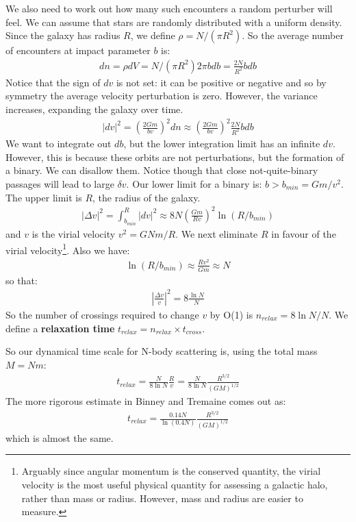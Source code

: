 \documentclass[12pt]{article}
\begin{document}
We also need to work out how many such encounters a random perturber will feel. We can assume that stars are randomly distributed with a uniform density. Since the galaxy has radius $R$, we define $\rho = N / (\pi R^2)$. So the average number of encounters at impact parameter $b$ is:
\begin{align}
 dn = \rho dV = N / (\pi R^2) 2 \pi b db = \frac{2 N}{R^2} b db
\end{align}
Notice that the sign of $dv$ is not set: it can be positive or negative and so by symmetry the average velocity perturbation is zero. However, the variance increases, expanding the galaxy over time.
\begin{align}
 |d v |^2 = \left(\frac{2 G m}{b v}\right)^2 dn \approx \left(\frac{2 G m}{b v}\right)^2 \frac{2 N}{R^2} b db
\end{align}
We want to integrate out $db$, but the lower integration limit has an infinite $dv$. However, this is because these orbits are not perturbations, but the formation of a binary. We can disallow them. Notice though that close not-quite-binary passages will lead to large $\delta v$. Our lower limit for a binary is: $b > b_{min} = G m / v^2$. The upper limit is $R$, the radius of the galaxy.
\begin{align}
 |\Delta v |^2 = \int^R_{b_{min}} |dv|^2 \approx 8 N \left(\frac{G m}{R v}\right)^2 \ln (R/b_{min})
\end{align}
and $v$ is the virial velocity $v^2 = G N m / R$. We next eliminate $R$ in favour of the virial velocity\footnote{Arguably since angular momentum is the conserved quantity, the virial velocity is the most useful physical quantity for assessing a galactic halo, rather than mass or radius. However, mass and radius are easier to measure.}. Also we have:
\begin{align}
\ln (R/b_{min}) \approx \frac{R v^2}{G m} \approx N
\end{align}
so that:
\begin{align}
 \left|\frac{\Delta v}{v} \right|^2 = 8 \frac{\ln N }{N}
\end{align}
So the number of crossings required to change $v$ by O(1) is $n_{relax} = 8 \ln N / N$.
We define a \textbf{relaxation time} $t_{relax} = n_{relax} \times t_{cross}$.

So our dynamical time scale for N-body scattering is, using the total mass $M = Nm$:
\begin{align}
t_{relax} = \frac{N}{8 \ln N} \frac{R}{v} = \frac{N}{8 \ln N} \frac{R^{3/2}}{(G M)^{1/2}}
\end{align}
The more rigorous estimate in Binney and Tremaine comes out as:
\begin{align}
t_{relax} =\frac{ 0.14 N}{\ln (0.4 N)} \frac{R^{3/2}}{(G M)^{1/2}}
\end{align}
which is almost the same.
\end{document}
